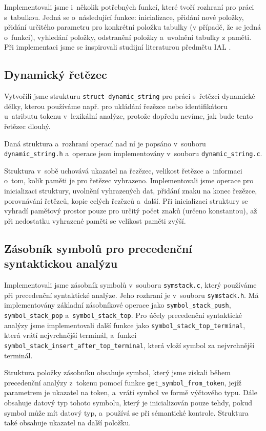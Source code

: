 \documentclass[a4paper, 11pt]{article}
\begin{document}
	Implementovali jsme i~několik potřebných funkcí, které tvoří rozhraní pro práci s~tabulkou.
	Jedná se o~následující funkce: inicializace, přidání nové položky, přidání určitého parametru
	pro konkrétní položku tabulky (v případě, že se jedná o~funkci), vyhledání položky, odstranění
	položky a~uvolnění tabulky z paměti. Při implementaci jsme se inspirovali studijní literaturou
	předmětu IAL \cite{Honzik1991}.


	\subsection{Dynamický řetězec}

	Vytvořili jsme strukturu \texttt{struct dynamic\_string} pro práci s~řetězci dynamické délky, kterou používáme
	např. pro ukládání řezězce nebo identifikátoru u~atributu tokenu v~lexikální analýze, protože dopředu nevíme,
	jak bude tento řetězec dlouhý.

	Daná struktura a~rozhraní operací nad ní je popsáno v~souboru \texttt{dynamic\_string.h} a~operace jsou implementovány
	v~souboru \texttt{dynamic\_string.c}.

	Struktura v~sobě uchovává ukazatel na řezězec, velikost řetězce a~informaci o~tom, kolik paměti je pro
	řetězec vyhrazeno. Implementovali jsme operace pro inicializaci struktury, uvolnění vyhrazených dat,
	přidání znaku na konec řezězce, porovnávání řetězců, kopie celých řezězců a~další. Při inicializaci struktury
	se vyhradí paměťový prostor pouze pro určitý počet znaků (určeno konstantou), až při nedostatku vyhrazené
	paměti se velikost paměti zvýší.


	\subsection{Zásobník symbolů pro precedenční syntaktickou analýzu}

	Implementovali jsme zásobník symbolů v~souboru \texttt{symstack.c}, který používáme při precedenční syntaktické analýze.
	Jeho rozhraní je v~souboru \texttt{symstack.h}. Má implementovány základní zásobníkové operace jako \texttt{symbol\_stack\_push},
	\texttt{symbol\_stack\_pop} a~\texttt{symbol\_stack\_top}. Pro účely precedenční syntaktické analýzy jsme implementovali další
	funkce jako \texttt{symbol\_stack\_top\_terminal}, která vrátí nejvrchnější terminál, a~funkci
	\texttt{symbol\_stack\_insert\_after\_top\_terminal}, která vloží symbol za nejvrchnější terminál.

	Struktura položky zásobníku obsahuje symbol, který jsme získali během precedenční analýzy z~tokenu pomocí funkce
	\texttt{get\_symbol\_from\_token}, jejíž parametrem je ukazatel na token, a~vrátí symbol ve formě výčtového typu.
	Dále obsahuje datový typ tohoto symbolu, který je inicializován pouze tehdy, pokud symbol může mít datový typ,
	a~používá se při sémantické kontrole. Struktura také obsahuje ukazatel na další položku.
\end{document}
